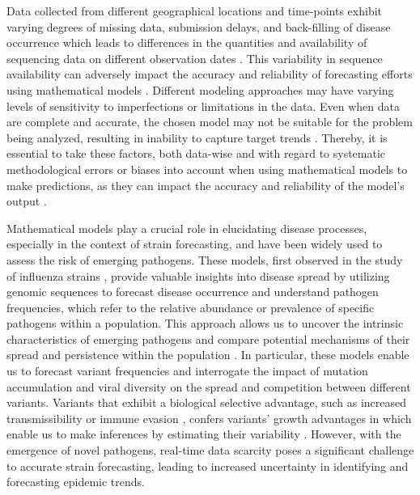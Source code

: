 \documentclass[11pt,oneside,letterpaper]{article}
\begin{document}
Data collected from different geographical locations and time-points exhibit varying degrees of missing data, submission delays, and back-filling of disease occurrence which leads to differences in the quantities and availability of sequencing data on different observation dates \cite{crepey_challenges_2022}.
This variability in sequence availability can adversely impact the accuracy and reliability of forecasting efforts using mathematical models \cite{suchard_bayesian_2018}.
Different modeling approaches may have varying levels of sensitivity to imperfections or limitations in the data.
Even when data are complete and accurate, the chosen model may not be suitable for the problem being analyzed, resulting in inability to capture target trends \cite{gelman_bayesian_2013}.
Thereby, it is essential to take these factors, both data-wise and with regard to systematic methodological errors or biases into account when using mathematical models to make predictions, as they can impact the accuracy and reliability of the model's output \cite{crepey_challenges_2022}.


Mathematical models play a crucial role in elucidating disease processes, especially in the context of strain forecasting, and have been widely used to assess the risk of emerging pathogens.
These models, first observed in the study of influenza strains \cite{luksza2014predictive, morris2018predictive, huddleston2020integrating}, provide valuable insights into disease spread by utilizing genomic sequences to forecast disease occurrence and understand pathogen frequencies, which refer to the relative abundance or prevalence of specific pathogens within a population.
This approach allows us to uncover the intrinsic characteristics of emerging pathogens and compare potential mechanisms of their spread and persistence within the population \cite{metcalf_opportunities_2017}.
In particular, these models enable us to forecast variant frequencies and interrogate the impact of mutation accumulation and viral diversity on the spread and competition between different variants.
Variants that exhibit a biological selective advantage, such as increased transmissibility or immune evasion  \cite{annavajhala2021emergence, faria2021genomics, obermeyer2022analysis}, confers variants' growth advantages in which enable us to make inferences by estimating their variability \cite{tegally_detection_2021}.
However, with the emergence of novel pathogens, real-time data scarcity poses a significant challenge to accurate strain forecasting, leading to increased uncertainty in identifying and forecasting epidemic trends.
\end{document}
